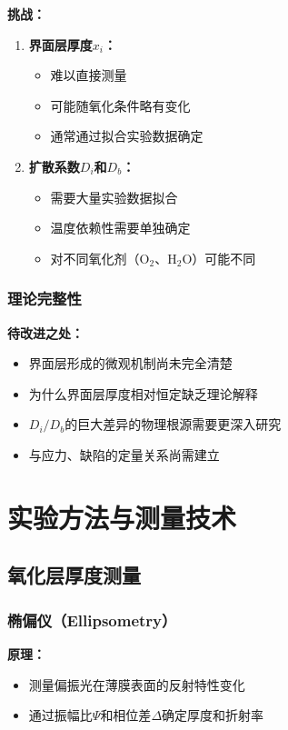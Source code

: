 \documentclass[UTF8,12pt,a4paper]{ctexart}
\begin{document}
\textbf{挑战：}
\begin{enumerate}
    \item \textbf{界面层厚度$x_i$：}
    \begin{itemize}
        \item 难以直接测量
        \item 可能随氧化条件略有变化
        \item 通常通过拟合实验数据确定
    \end{itemize}
    
    \item \textbf{扩散系数$D_i$和$D_b$：}
    \begin{itemize}
        \item 需要大量实验数据拟合
        \item 温度依赖性需要单独确定
        \item 对不同氧化剂（O$_2$、H$_2$O）可能不同
    \end{itemize}
\end{enumerate}

\subsubsection{理论完整性}

\textbf{待改进之处：}
\begin{itemize}
    \item 界面层形成的微观机制尚未完全清楚
    \item 为什么界面层厚度相对恒定缺乏理论解释
    \item $D_i/D_b$的巨大差异的物理根源需要更深入研究
    \item 与应力、缺陷的定量关系尚需建立
\end{itemize}

\newpage
\section{实验方法与测量技术}

\subsection{氧化层厚度测量}

\subsubsection{椭偏仪（Ellipsometry）}

\textbf{原理：}
\begin{itemize}
    \item 测量偏振光在薄膜表面的反射特性变化
    \item 通过振幅比$\Psi$和相位差$\Delta$确定厚度和折射率
\end{itemize}
\end{document}
